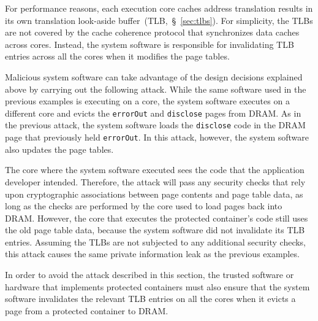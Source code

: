 For performance reasons, each execution core caches address translation results
in its own translation look-aside buffer~(TLB,~\S~\ref{sec:tlbs}). For
simplicity, the TLBs are not covered by the cache coherence protocol that
synchronizes data caches across cores. Instead, the system software is
responsible for invalidating TLB entries across all the cores when it modifies
the page tables.

Malicious system software can take advantage of the design decisions explained
above by carrying out the following attack. While the same software used in the
previous examples is executing on a core, the system software executes on a
different core and evicts the \texttt{errorOut} and \texttt{disclose} pages
from DRAM. As in the previous attack, the system software loads the
\texttt{disclose} code in the DRAM page that previously held \texttt{errorOut}.
In this attack, however, the system software also updates the page tables.

The core where the system software executed sees the code that the application
developer intended. Therefore, the attack will pass any security checks that
rely upon cryptographic associations between page contents and page table data,
as long as the checks are performed by the core used to load pages back into
DRAM. However, the core that executes the protected container's code still uses
the old page table data, because the system software did not invalidate its TLB
entries. Assuming the TLBs are not subjected to any additional security checks,
this attack causes the same private information leak as the previous examples.

In order to avoid the attack described in this section, the trusted software or
hardware that implements protected containers must also ensure that the system
software invalidates the relevant TLB entries on all the cores when it evicts a
page from a protected container to DRAM.

